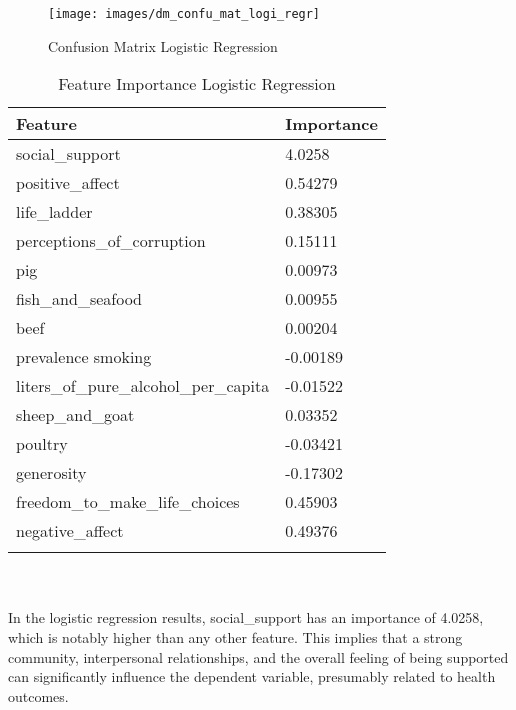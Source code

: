 		\begin{figure}[h!]
			\centering
			\texttt{[image: images/dm\_confu\_mat\_logi\_regr]}
			\caption{Confusion Matrix Logistic Regression}
			\label{fig:log_reg}
		\end{figure}
		\begin{table}[h!]
			\centering
			\caption{Feature Importance Logistic Regression}
			\begin{tabularx}{0.8\textwidth}{lX}
				\toprule
				\textbf{Feature}                   & \textbf{Importance} \\
				\midrule
				social\_support                        & 4.0258              \\
				positive\_affect                       & 0.54279             \\
				life\_ladder                           & 0.38305             \\
				perceptions\_of\_corruption            & 0.15111             \\
				pig                                    & 0.00973             \\
				fish\_and\_seafood                     & 0.00955             \\
				beef                                   & 0.00204             \\
				prevalence smoking                     & -0.00189            \\
				liters\_of\_pure\_alcohol\_per\_capita & -0.01522            \\
				sheep\_and\_goat                       & 0.03352             \\
				poultry                                & -0.03421            \\
				generosity                             & -0.17302            \\
				freedom\_to\_make\_life\_choices       & 0.45903             \\
				negative\_affect                       & 0.49376             \\
				\bottomrule
				\label{table:fi_logistic}
			\end{tabularx}
		\end{table}
		\\
		\\
		In the logistic regression results, social\_support has an importance of 4.0258, which is notably higher than
		any other feature. This implies that a strong community, interpersonal relationships, and the overall feeling
		of being supported can significantly influence the dependent variable, presumably related to health outcomes.
